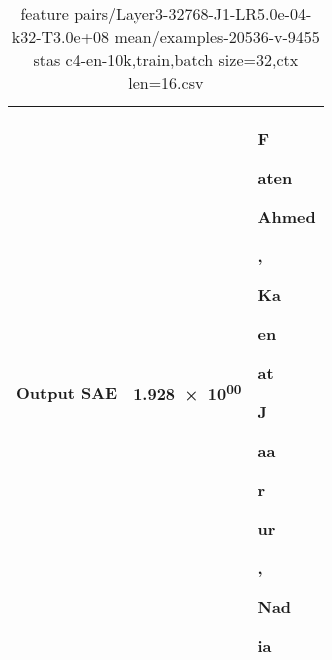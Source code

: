 \begin{table}
\begin{longtable}{lrl}
Output SAE & \num{1.928e+00} & \colorbox{Magenta!0.000}{\strut  F} \colorbox{Magenta!0.000}{\strut aten} \colorbox{Magenta!0.000}{\strut  Ahmed} \colorbox{Magenta!0.000}{\strut ,} \colorbox{Magenta!0.000}{\strut  Ka} \colorbox{Magenta!0.000}{\strut en} \colorbox{Magenta!0.000}{\strut at} \colorbox{Magenta!0.000}{\strut  J} \colorbox{Magenta!21.327}{\strut aa} \colorbox{Magenta!15.639}{\strut \textquotesingle{}} \colorbox{Magenta!21.876}{\strut r} \colorbox{Magenta!21.807}{\strut ur} \colorbox{Magenta!0.000}{\strut ,} \colorbox{Magenta!0.000}{\strut  Nad} \colorbox{Magenta!0.000}{\strut ia} \\
\bottomrule
\end{longtable}
\caption{feature pairs/Layer3-32768-J1-LR5.0e-04-k32-T3.0e+08 mean/examples-20536-v-9455 stas c4-en-10k,train,batch size=32,ctx len=16.csv}
\end{table}